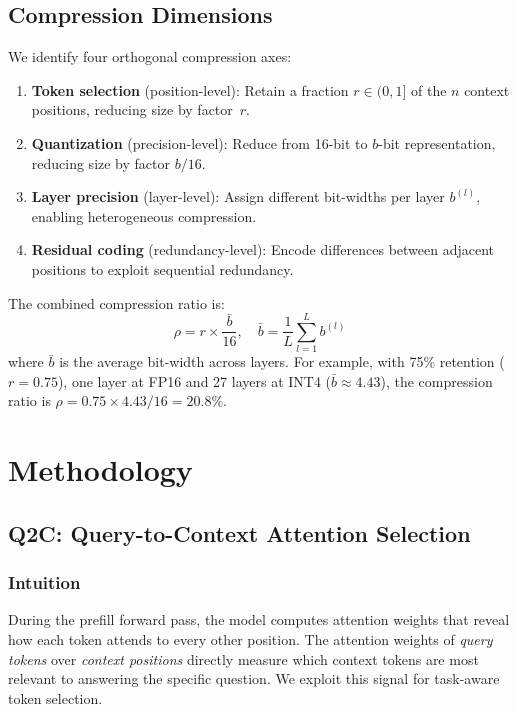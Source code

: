 \documentclass[conference]{IEEEtran}
\newcommand{\QtoC}{\textsc{Q2C}\xspace}
\begin{document}
\subsection{Compression Dimensions}

We identify four orthogonal compression axes:

\begin{enumerate}
    \item \textbf{Token selection} (position-level): Retain a fraction $r \in (0, 1]$ of the $n$ context positions, reducing size by factor~$r$.
    \item \textbf{Quantization} (precision-level): Reduce from 16-bit to $b$-bit representation, reducing size by factor $b/16$.
    \item \textbf{Layer precision} (layer-level): Assign different bit-widths per layer $b^{(l)}$, enabling heterogeneous compression.
    \item \textbf{Residual coding} (redundancy-level): Encode differences between adjacent positions to exploit sequential redundancy.
\end{enumerate}

The combined compression ratio is:
\begin{equation}
    \rho = r \times \frac{\bar{b}}{16}, \quad \bar{b} = \frac{1}{L}\sum_{l=1}^{L} b^{(l)}
\end{equation}
where $\bar{b}$ is the average bit-width across layers.
For example, with 75\% retention ($r=0.75$), one layer at FP16 and 27 layers at INT4 ($\bar{b} \approx 4.43$), the compression ratio is $\rho = 0.75 \times 4.43/16 = 20.8\%$.


\section{Methodology}
\label{sec:method}

\subsection{\QtoC: Query-to-Context Attention Selection}

\subsubsection{Intuition}
During the prefill forward pass, the model computes attention weights that reveal how each token attends to every other position.
The attention weights of \emph{query tokens} over \emph{context positions} directly measure which context tokens are most relevant to answering the specific question.
We exploit this signal for task-aware token selection.
\end{document}
